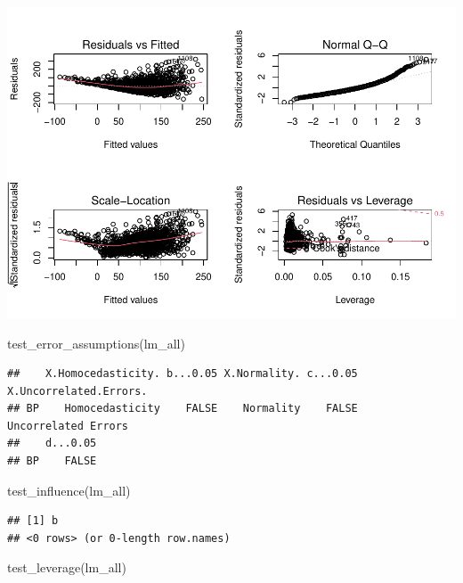 \documentclass[
]{article}
\newenvironment{Shaded}{\begin{snugshade}}{\end{snugshade}}
\newcommand{\FunctionTok}[1]{\textcolor[rgb]{0.00,0.00,0.00}{#1}}
\newcommand{\NormalTok}[1]{#1}
\begin{document}
\includegraphics{Final_Project_1_files/figure-latex/unnamed-chunk-8-1.pdf}

\begin{Shaded}
\begin{Highlighting}[]
\FunctionTok{test\_error\_assumptions}\NormalTok{(lm\_all)}
\end{Highlighting}
\end{Shaded}

\begin{verbatim}
##    X.Homocedasticity. b...0.05 X.Normality. c...0.05 X.Uncorrelated.Errors.
## BP    Homocedasticity    FALSE    Normality    FALSE    Uncorrelated Errors
##    d...0.05
## BP    FALSE
\end{verbatim}

\begin{Shaded}
\begin{Highlighting}[]
\FunctionTok{test\_influence}\NormalTok{(lm\_all)}
\end{Highlighting}
\end{Shaded}

\begin{verbatim}
## [1] b
## <0 rows> (or 0-length row.names)
\end{verbatim}

\begin{Shaded}
\begin{Highlighting}[]
\FunctionTok{test\_leverage}\NormalTok{(lm\_all)}
\end{Highlighting}
\end{Shaded}
\end{document}
